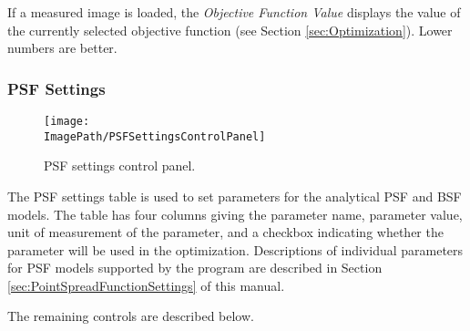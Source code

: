 \documentclass[11pt,titlepage,twoside]{article}
\begin{document}
If a measured image is loaded, the \emph{Objective Function Value} displays the value of the currently selected objective function (see Section \ref{sec:Optimization}). Lower numbers are better.

\subsubsection{PSF Settings}

\begin{figure}[h]
  \centering
  \texttt{[image: \\ImagePath/PSFSettingsControlPanel]}
  \caption{PSF settings control panel.}
  \label{fig:PSFSettingsControlPanel}
\end{figure}

The PSF settings table is used to set parameters for the analytical PSF and BSF models. The table has four columns giving the parameter name, parameter value, unit of measurement of the parameter, and a checkbox indicating whether the parameter will be used in the optimization. Descriptions of individual parameters for PSF models supported by the program are described in Section \ref{sec:PointSpreadFunctionSettings} of this manual.

The remaining controls are described below.
\end{document}

